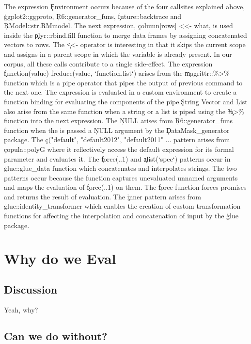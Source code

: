 \documentclass[screen,acmsmall]{acmart}
\begin{document}
The expression \c{Environment} occurs because of the four callsites
explained above, \c{ggplot2::ggproto}, \c{R6::generator\_funs},
\c{future::backtrace} and \c{RModel::str.RMmodel}. The next
expression, \c{column[rows] <<- what}, is used inside the
\c{plyr::rbind.fill} function to merge data frames by assigning
concatenated vectors to rows. The \c{<<-} operator is interesting in
that it skips the current scope and assigns in a parent scope in which
the variable is already present. In our corpus, all these \eval calls
contribute to a single side-effect. The expression \c{function(value)
  freduce(value, `function.list`)} arises from the
\c{magrittr::\%>\%} function which is a pipe operator that pipes the
output of previous command to the next one. The expression is
evaluated in a custom environment to create a function binding for
evaluating the components of the pipe.\c{String Vector} and \c{List}
also arise from the same function when a string or a list is piped
using the \c{\%>\%} function into the next expression. The \c{NULL}
arises from \c{R6::generator\_funs} function when the \eval is passed a
\c{NULL} argument by the \c{DataMask\_generator} package. The
\c{c("default", "default2012", "default2011" ...} pattern arises from
\c{copula::polyG} where it reflectively access the default expression
for its formal parameter and evaluates it. The \c{force(..1)} and
\c{alist(`spec`)} patterns occur in \c{glue::glue\_data} function
which concatenates and interpolates strings. The two patterns occur
because the function captures unevaluated unnamed arguments and maps
the evaluation of \c{force(..1)} on them. The \c{force} function
forces promises and returns the result of evaluation. The \c{inner}
pattern arises from \c{glue::identity\_transformer} which enables the
creation of custom transformation functions for affecting the
interpolation and concatenation of input by the \c{glue} package.


\section{Why do we Eval}

\subsection{Discussion}

Yeah, why?

\subsection{Can we do without?}
\end{document}
